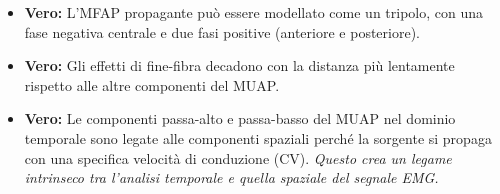 \begin{itemize}
    \item \textbf{Vero:} L'MFAP propagante può essere modellato come un tripolo, con una fase negativa centrale e due fasi positive (anteriore e posteriore).
    
    \item \textbf{Vero:} Gli effetti di fine-fibra decadono con la distanza più lentamente rispetto alle altre componenti del MUAP.
    
    \item \textbf{Vero:} Le componenti passa-alto e passa-basso del MUAP nel dominio temporale sono legate alle componenti spaziali perché la sorgente si propaga con una specifica velocità di conduzione (CV).
    \textit{Questo crea un legame intrinseco tra l'analisi temporale e quella spaziale del segnale EMG.}
\end{itemize}

